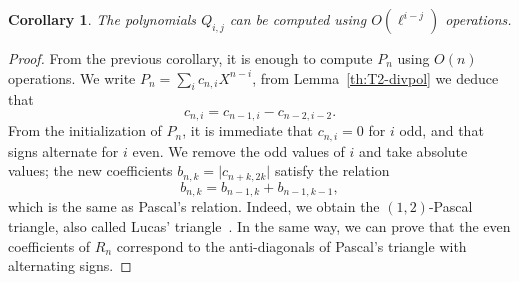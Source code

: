 \documentclass{sig-alternate}
\newtheorem{corollary}[definition]{Corollary}
\begin{document}
\begin{corollary}
  The polynomials $Q_{i,j}$ can be computed using $O(\ell^{i-j})$
  operations.
\end{corollary}
\begin{proof}
  From the previous corollary, it is enough to compute $P_n$ using
  $O(n)$ operations. We write $P_n = \sum_i c_{n,i}X^{n-i}$, from
  Lemma~\ref{th:T2-divpol} we deduce that
  \begin{equation}
    c_{n,i} = c_{n-1,i} - c_{n-2,i-2}.
  \end{equation}
  From the initialization of $P_n$, it is immediate that $c_{n,i}=0$
  for $i$ odd, and that signs alternate for $i$ even. We remove the
  odd values of $i$ and take absolute values; the new coefficients
  $b_{n,k}=\lvert c_{n+k,2k}\rvert$ satisfy the relation
  \begin{equation*}
    b_{n,k} = b_{n-1,k} + b_{n-1,k-1},
  \end{equation*}
  which is the same as Pascal's relation. Indeed, we obtain the
  $(1,2)$-Pascal triangle, also called Lucas'
  triangle~\cite{benjamin10}.
  In the same way, we can prove that the even coefficients of $R_n$
  correspond to the anti-diagonals of Pascal's triangle with
  alternating signs.
  

\end{proof}
\end{document}
